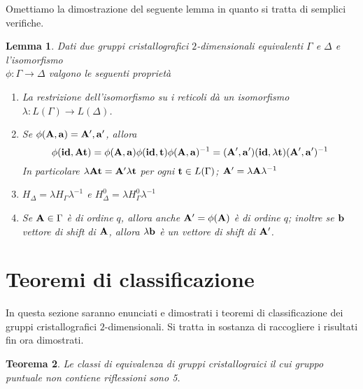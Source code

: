 \documentclass[a4paper,11pt,openright,twoside	]{book}
\newtheorem{theorem}{Teorema}[section]
\newtheorem{lemma}[theorem]{Lemma}
\begin{document}
Omettiamo la dimostrazione del seguente lemma in quanto si tratta di semplici verifiche. 
\begin{lemma}
Dati due gruppi cristallografici $2$-dimensionali equivalenti $\Gamma$ e $\Delta$ e l'isomorfismo \\ $\phi : \Gamma \longrightarrow \Delta$ valgono le seguenti proprietà
\begin{enumerate}
\item La restrizione dell'isomorfismo su i reticoli dà un isomorfismo $\lambda: L(\Gamma) \longrightarrow L(\Delta)$.
\item Se $\phi(\vb{A, a}) = \vb{A', a'} $, allora 
\[ \phi(\vb{id, At}) = \phi(\vb{A,a})\phi(\vb{id, t})\phi(\vb{A,a})^{-1} =( \vb{A',a'})(\vb{id}, \lambda \vb{t})( \vb{A',a'})^{-1}\]
In particolare $\lambda \vb{At} = \vb{A}' \lambda \vb{t}$ per ogni $\vb{t} \in L(\Gamma)$; $\vb{A'} = \lambda \vb{A} \lambda^{-1}$
\item $H_{\Delta} = \lambda H_{\Gamma} \lambda^{-1}$ e $H_{\Delta}^{0} = \lambda H_{\Gamma}^{0} \lambda^{-1}$
\item Se $\vb{A} \in \Gamma$ è di ordine $q$, allora anche $\vb{A'} = \phi(\vb{A})$ è di ordine $q$; inoltre se $\vb{b}$ vettore di shift di $\vb{A}$, allora $\lambda \vb{b}$ è un vettore di shift di $\vb{A'}$. 
\end{enumerate}
\end{lemma}
\section{Teoremi di classificazione}
In questa sezione saranno enunciati e dimostrati i teoremi di classificazione dei gruppi cristallografici $2$-dimensionali. Si tratta in sostanza di raccogliere i risultati fin ora dimostrati. 

\begin{theorem}
Le classi di equivalenza di gruppi cristallograici il cui gruppo puntuale non contiene riflessioni sono 5.
\end{theorem}
\end{document}
